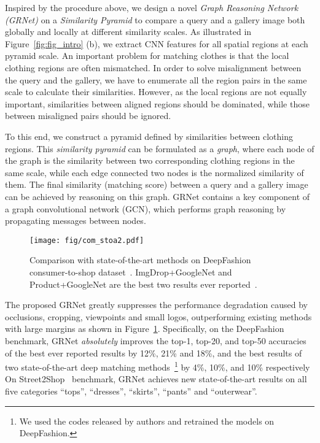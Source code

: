\documentclass[10pt,twocolumn,letterpaper]{article}
\begin{document}
Inspired by the procedure above, we design a novel \emph{Graph Reasoning Network (GRNet)} on a \emph{Similarity Pyramid} to compare a query and a gallery image both globally and locally at different similarity scales.
As illustrated in Figure~\ref{fig:fig_intro} (b), we extract CNN features for all spatial regions at each pyramid scale. An important problem for matching clothes is that the local clothing regions are often mismatched.
In order to solve misalignment between the query and the gallery, we have to enumerate all the region pairs in the same scale to calculate their similarities.
However, as the local regions are not equally important, similarities between aligned regions should be dominated, while those between misaligned pairs should be ignored.



To this end, we construct a pyramid defined by similarities between clothing regions.
This \emph{similarity pyramid} can be formulated as a \emph{graph}, where each node of the graph is the similarity between two corresponding clothing regions in the same scale, while each edge connected two nodes is the normalized similarity of them.
The final similarity (matching score) between a query and a gallery image can be achieved by reasoning on this graph.
GRNet contains a key component of a graph convolutional network (GCN), which performs graph reasoning by propagating messages between nodes.

\begin{figure}
\begin{minipage}{0.9\linewidth}
\centerline{ \texttt{[image: fig/com\_stoa2.pdf]}}
\end{minipage}
\caption{Comparison with state-of-the-art methods on DeepFashion consumer-to-shop dataset~\cite{Liu2016}. ImgDrop+GoogleNet and Product+GoogleNet are the best two results ever reported~\cite{Wang2018b}.}
\label{fig:comp_sota}
\end{figure}

The proposed GRNet greatly suppresses the performance degradation caused by occlusions, cropping, viewpoints and small logos, outperforming existing methods with large margins as shown in Figure~\ref{fig:comp_sota}.
Specifically, on the DeepFashion~\cite{Liu2016} benchmark, GRNet \emph{absolutely} improves the top-1, top-20, and top-50 accuracies of the best ever reported results by 12\%, 21\% and 18\%,  and the best results of two state-of-the-art deep matching methods~\cite{Shen_2018_CVPR,Xuan2018}\footnote{We used the codes released by authors and retrained the models on DeepFashion.} by 4\%, 10\%, and 10\% respectively
On Street2Shop~\cite{Kiapour2015} benchmark, GRNet achieves new state-of-the-art results on all five categories \ie ``tops'', ``dresses'', ``skirts'', ``pants'' and ``outerwear''.
\end{document}
